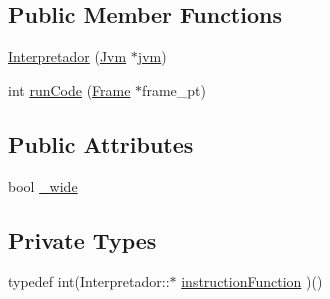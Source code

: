 \subsection*{Public Member Functions}
\begin{DoxyCompactItemize}
\item 
\hyperlink{classInterpretador_a88354439afcfe11ce59c99041b9c4e3d}{Interpretador} (\hyperlink{classJvm}{Jvm} $\ast$\hyperlink{classInterpretador_aed3bd481ff345333414aa70360a94b7c}{jvm})
\item 
int \hyperlink{classInterpretador_a1bf25d40632df21fe829848201824595}{run\+Code} (\hyperlink{classFrame}{Frame} $\ast$frame\+\_\+pt)
\end{DoxyCompactItemize}
\subsection*{Public Attributes}
\begin{DoxyCompactItemize}
\item 
bool \hyperlink{classInterpretador_acc44aa8b361e93c3ddbeb5a6cf7978df}{\+\_\+wide}
\end{DoxyCompactItemize}
\subsection*{Private Types}
\begin{DoxyCompactItemize}
\item 
typedef int(Interpretador\+::$\ast$ \hyperlink{classInterpretador_a0c7f1073259b205ff698b95db287e713}{instruction\+Function} )()
\end{DoxyCompactItemize}
